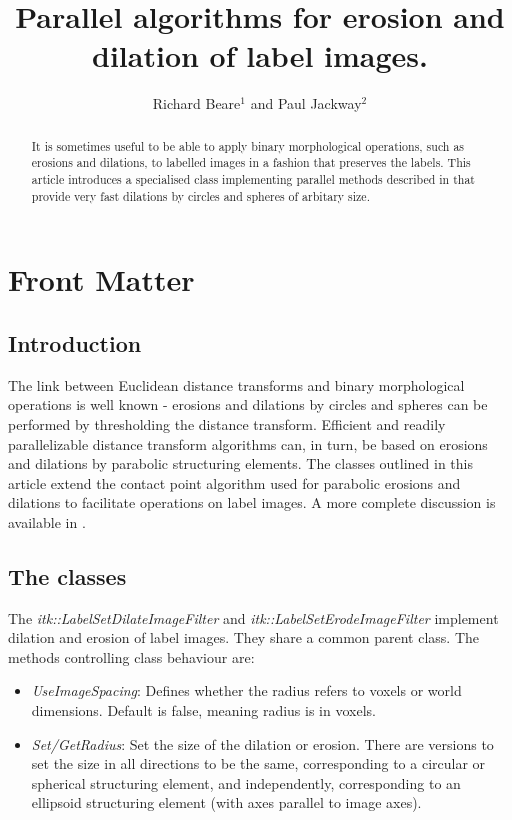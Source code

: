 \documentclass{InsightArticle}
\title{Parallel algorithms for erosion and dilation of label images.}
\author{Richard Beare{$^1$} {\small and} Paul Jackway{$^2$}}
\newcommand{\IJhandlerIDnumber}{999}
\begin{document}
\IJhandlefooter{\IJhandlerIDnumber}

\maketitle

\ifhtml
\chapter*{Front Matter\label{front}}
\fi


\begin{abstract}
\noindent
It is sometimes useful to be able to apply binary morphological
operations, such as erosions and dilations, to labelled images in a
fashion that preserves the labels. This article introduces a
specialised class implementing parallel methods described in
\cite{beare2011parallel} that provide very fast dilations by circles
and spheres of arbitary size.
\end{abstract}

\tableofcontents

\section{Introduction}
The link between Euclidean distance transforms and binary
morphological operations is well known - erosions and dilations by
circles and spheres can be performed by thresholding the distance
transform. Efficient and readily parallelizable distance transform
algorithms can, in turn, be based on erosions and dilations by
parabolic structuring elements. The classes outlined in this article
extend the contact point algorithm used for parabolic erosions and
dilations to facilitate operations on label images. A more complete discussion is available in \cite{beare2011parallel}.

\section{The classes}
The {\em itk::LabelSetDilateImageFilter} and {\em
  itk::LabelSetErodeImageFilter} implement dilation and erosion of
label images. They share a common parent class. The methods controlling class behaviour are:
\begin{itemize}
\item {\em UseImageSpacing}: Defines whether the radius refers to voxels or world dimensions. Default is false, meaning radius is in voxels.
\item {\em Set/GetRadius}: Set the size of the dilation or erosion. There are versions to set the size in all directions to be the same, corresponding to a circular or spherical structuring element, and independently, corresponding to an ellipsoid structuring element (with axes parallel to image axes).
\end{itemize}
\end{document}
